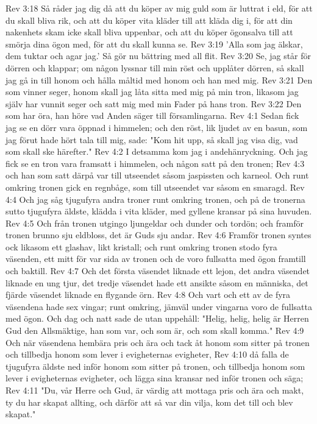 Rev 3:18  Så råder jag dig då att du köper av mig guld som är luttrat i eld, för att du skall bliva rik, och att du köper vita kläder till att kläda dig i, för att din nakenhets skam icke skall bliva uppenbar, och att du köper ögonsalva till att smörja dina ögon med, för att du skall kunna se.
Rev 3:19  'Alla som jag älskar, dem tuktar och agar jag.' Så gör nu bättring med all flit.
Rev 3:20  Se, jag står för dörren och klappar; om någon lyssnar till min röst och upplåter dörren, så skall jag gå in till honom och hålla måltid med honom och han med mig.
Rev 3:21  Den som vinner seger, honom skall jag låta sitta med mig på min tron, likasom jag själv har vunnit seger och satt mig med min Fader på hans tron.
Rev 3:22  Den som har öra, han höre vad Anden säger till församlingarna.
Rev 4:1  Sedan fick jag se en dörr vara öppnad i himmelen; och den röst, lik ljudet av en basun, som jag förut hade hört tala till mig, sade: "Kom hit upp, så skall jag visa dig, vad som skall ske härefter."
Rev 4:2  I detsamma kom jag i andehänryckning. Och jag fick se en tron vara framsatt i himmelen, och någon satt på den tronen;
Rev 4:3  och han som satt därpå var till utseendet såsom jaspissten och karneol. Och runt omkring tronen gick en regnbåge, som till utseendet var såsom en smaragd.
Rev 4:4  Och jag såg tjugufyra andra troner runt omkring tronen, och på de tronerna sutto tjugufyra äldste, klädda i vita kläder, med gyllene kransar på sina huvuden.
Rev 4:5  Och från tronen utgingo ljungeldar och dunder och tordön; och framför tronen brunno sju eldbloss, det är Guds sju andar.
Rev 4:6  Framför tronen syntes ock likasom ett glashav, likt kristall; och runt omkring tronen stodo fyra väsenden, ett mitt för var sida av tronen och de voro fullsatta med ögon framtill och baktill.
Rev 4:7  Och det första väsendet liknade ett lejon, det andra väsendet liknade en ung tjur, det tredje väsendet hade ett ansikte såsom en människa, det fjärde väsendet liknade en flygande örn.
Rev 4:8  Och vart och ett av de fyra väsendena hade sex vingar; runt omkring, jämväl under vingarna voro de fullsatta med ögon. Och dag och natt sade de utan uppehåll: "Helig, helig, helig är Herren Gud den Allsmäktige, han som var, och som är, och som skall komma."
Rev 4:9  Och när väsendena hembära pris och ära och tack åt honom som sitter på tronen och tillbedja honom som lever i evigheternas evigheter,
Rev 4:10  då falla de tjugufyra äldste ned inför honom som sitter på tronen, och tillbedja honom som lever i evigheternas evigheter, och lägga sina kransar ned inför tronen och säga;
Rev 4:11  "Du, vår Herre och Gud, är värdig att mottaga pris och ära och makt, ty du har skapat allting, och därför att så var din vilja, kom det till och blev skapat."
